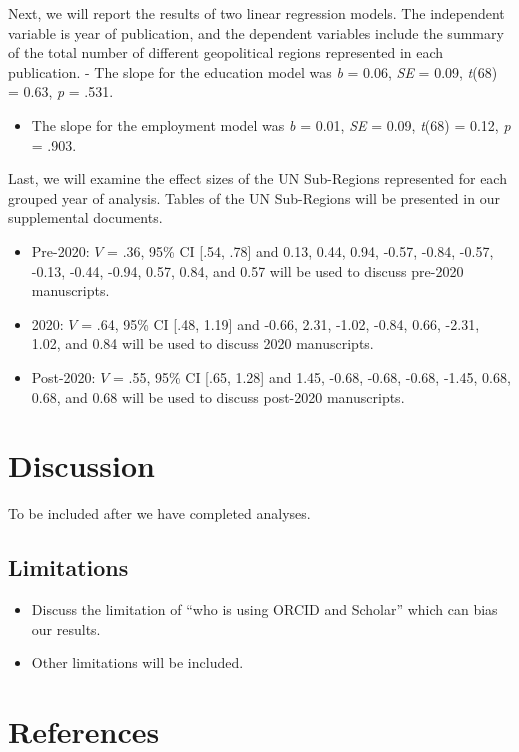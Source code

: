 \documentclass[
  man]{apa6}
\providecommand{\tightlist}{%
  \setlength{\itemsep}{0pt}\setlength{\parskip}{0pt}}
\newlength{\cslhangindent}
\newlength{\cslentryspacingunit} %
\newenvironment{CSLReferences}[2] %
 {%
  \setlength{\parindent}{0pt}
  \ifodd #1
  \let\oldpar\par
  \def\par{\hangindent=\cslhangindent\oldpar}
  \fi
  \setlength{\parskip}{#2\cslentryspacingunit}
 }%
 {}
\begin{document}
Next, we will report the results of two linear regression models. The independent variable is year of publication, and the dependent variables include the summary of the total number of different geopolitical regions represented in each publication.
- The slope for the education model was \emph{b} = 0.06, \emph{SE} = 0.09, \emph{t}(68) = 0.63, \emph{p} = .531.

\begin{itemize}
\tightlist
\item
  The slope for the employment model was \emph{b} = 0.01, \emph{SE} = 0.09, \emph{t}(68) = 0.12, \emph{p} = .903.
\end{itemize}

Last, we will examine the effect sizes of the UN Sub-Regions represented for each grouped year of analysis. Tables of the UN Sub-Regions will be presented in our supplemental documents.

\begin{itemize}
\item
  Pre-2020: \(V\) = .36, 95\% CI {[}.54, .78{]} and 0.13, 0.44, 0.94, -0.57, -0.84, -0.57, -0.13, -0.44, -0.94, 0.57, 0.84, and 0.57 will be used to discuss pre-2020 manuscripts.
\item
  2020: \(V\) = .64, 95\% CI {[}.48, 1.19{]} and -0.66, 2.31, -1.02, -0.84, 0.66, -2.31, 1.02, and 0.84 will be used to discuss 2020 manuscripts.
\item
  Post-2020: \(V\) = .55, 95\% CI {[}.65, 1.28{]} and 1.45, -0.68, -0.68, -0.68, -1.45, 0.68, 0.68, and 0.68 will be used to discuss post-2020 manuscripts.
\end{itemize}

\hypertarget{discussion}{%
\section{Discussion}\label{discussion}}

To be included after we have completed analyses.

\hypertarget{limitations}{%
\subsection{Limitations}\label{limitations}}

\begin{itemize}
\tightlist
\item
  Discuss the limitation of ``who is using ORCID and Scholar'' which can bias our results.
\item
  Other limitations will be included.
\end{itemize}

\newpage

\hypertarget{references}{%
\section{References}\label{references}}

\begingroup
\setlength{\parindent}{-0.5in}
\setlength{\leftskip}{0.5in}

\hypertarget{refs}{}
\begin{CSLReferences}{0}{0}
\end{CSLReferences}

\endgroup
\end{document}
